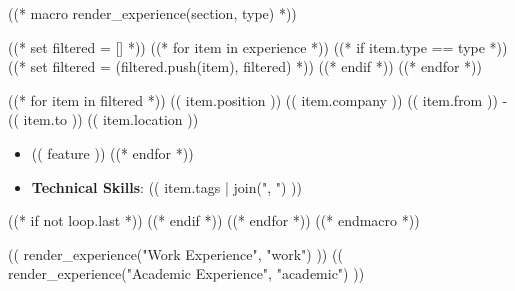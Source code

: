 ((* macro render_experience(section, type) *))

  ((* set filtered = [] *))
  ((* for item in experience *))
    ((* if item.type == type *))
      ((* set filtered = (filtered.push(item), filtered) *))
    ((* endif *))
  ((* endfor *))

  ((* for item in filtered *))
    \cvevent
      {(( item.position ))}
      {(( item.company ))}
      {(( item.from )) - (( item.to ))}
      {(( item.location ))}
    \begin{itemize}
      ((* for feature in item.features *))
        \item (( feature ))
      ((* endfor *))
      \item \textbf{Technical Skills}: (( item.tags | join(", ") ))
    \end{itemize}
    ((* if not loop.last *))
      \divider
    ((* endif *))
  ((* endfor *))
  \smallskip
((* endmacro *))

(( render_experience("Work Experience", "work") ))
(( render_experience("Academic Experience", "academic") ))
